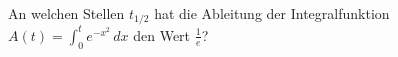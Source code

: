 \begin{ExerciseBlock}
An welchen Stellen $t_{1/2}$ hat die Ableitung der Integralfunktion $\displaystyle A(t)=\int_0^t e^{-x^2}\,dx$ den Wert $\frac{1}{e}$?

\end{ExerciseBlock}
